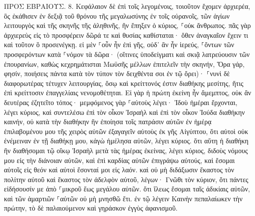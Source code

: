 \documentclass[twoside, 9pt]{extreport}
\begin{document}
ΠΡΟΣ ΕΒΡΑΙΟΥΣ.
8.
Κεφάλαιον δὲ ἐπὶ τοῖς λεγομένοις, τοιοῦτον ἔχομεν ἀρχιερέα, ὃς ἐκάθισεν ἐν δεξιᾷ τοῦ θρόνου τῆς μεγαλωσύνης ἐν τοῖς οὐρανοῖς, 
τῶν ἁγίων λειτουργὸς καὶ τῆς σκηνῆς τῆς ἀληθινῆς, ἣν ἔπηξεν ὁ κύριος, ⸀οὐκ ἄνθρωπος. 
πᾶς γὰρ ἀρχιερεὺς εἰς τὸ προσφέρειν δῶρά τε καὶ θυσίας καθίσταται· ὅθεν ἀναγκαῖον ἔχειν τι καὶ τοῦτον ὃ προσενέγκῃ. 
εἰ μὲν ⸀οὖν ἦν ἐπὶ γῆς, οὐδ᾽ ἂν ἦν ἱερεύς, ⸀ὄντων τῶν προσφερόντων κατὰ ⸀νόμον τὰ δῶρα· 
(οἵτινες ὑποδείγματι καὶ σκιᾷ λατρεύουσιν τῶν ἐπουρανίων, καθὼς κεχρημάτισται Μωϋσῆς μέλλων ἐπιτελεῖν τὴν σκηνήν, Ὅρα γάρ, φησίν, ποιήσεις πάντα κατὰ τὸν τύπον τὸν δειχθέντα σοι ἐν τῷ ὄρει)· 
⸀νυνὶ δὲ διαφορωτέρας τέτυχεν λειτουργίας, ὅσῳ καὶ κρείττονός ἐστιν διαθήκης μεσίτης, ἥτις ἐπὶ κρείττοσιν ἐπαγγελίαις νενομοθέτηται. 
Εἰ γὰρ ἡ πρώτη ἐκείνη ἦν ἄμεμπτος, οὐκ ἂν δευτέρας ἐζητεῖτο τόπος· 
μεμφόμενος γὰρ ⸀αὐτοὺς λέγει· Ἰδοὺ ἡμέραι ἔρχονται, λέγει κύριος, καὶ συντελέσω ἐπὶ τὸν οἶκον Ἰσραὴλ καὶ ἐπὶ τὸν οἶκον Ἰούδα διαθήκην καινήν, 
οὐ κατὰ τὴν διαθήκην ἣν ἐποίησα τοῖς πατράσιν αὐτῶν ἐν ἡμέρᾳ ἐπιλαβομένου μου τῆς χειρὸς αὐτῶν ἐξαγαγεῖν αὐτοὺς ἐκ γῆς Αἰγύπτου, ὅτι αὐτοὶ οὐκ ἐνέμειναν ἐν τῇ διαθήκῃ μου, κἀγὼ ἠμέλησα αὐτῶν, λέγει κύριος. 
ὅτι αὕτη ἡ διαθήκη ἣν διαθήσομαι τῷ οἴκῳ Ἰσραὴλ μετὰ τὰς ἡμέρας ἐκείνας, λέγει κύριος, διδοὺς νόμους μου εἰς τὴν διάνοιαν αὐτῶν, καὶ ἐπὶ καρδίας αὐτῶν ἐπιγράψω αὐτούς, καὶ ἔσομαι αὐτοῖς εἰς θεόν καὶ αὐτοὶ ἔσονταί μοι εἰς λαόν. 
καὶ οὐ μὴ διδάξωσιν ἕκαστος τὸν πολίτην αὐτοῦ καὶ ἕκαστος τὸν ἀδελφὸν αὐτοῦ, λέγων· Γνῶθι τὸν κύριον, ὅτι πάντες εἰδήσουσίν με ἀπὸ ⸀μικροῦ ἕως μεγάλου αὐτῶν. 
ὅτι ἵλεως ἔσομαι ταῖς ἀδικίαις αὐτῶν, καὶ τῶν ἁμαρτιῶν ⸀αὐτῶν οὐ μὴ μνησθῶ ἔτι. 
ἐν τῷ λέγειν Καινὴν πεπαλαίωκεν τὴν πρώτην, τὸ δὲ παλαιούμενον καὶ γηράσκον ἐγγὺς ἀφανισμοῦ. 
\end{document}
